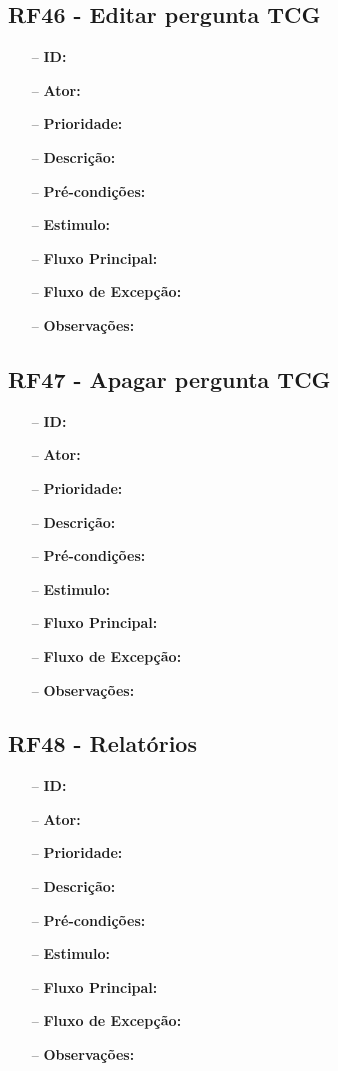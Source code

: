 \subsection{RF46 - Editar pergunta TCG}
\begin{itemize}
	\item[--] \textbf{ID:} 
	\item[--]  \textbf{Ator:} 
	\item[--]  \textbf{Prioridade:} 
	\item[--]  \textbf{Descrição:} 
	\item[--]  \textbf{Pré-condições:} 
	\item[--]  \textbf{Estimulo:}
	\item[--]  \textbf{Fluxo Principal:} 
	\subitem
	\subitem
	\subitem
	\subitem
	\item[--]  \textbf{Fluxo de Excepção:} 
	\subitem
	\subitem
	\subitem
	\subitem
	\item[--]  \textbf{Observações:} 
\end{itemize}
\newpage

\subsection{RF47 - Apagar pergunta TCG}
\begin{itemize}
	\item[--] \textbf{ID:} 
	\item[--]  \textbf{Ator:} 
	\item[--]  \textbf{Prioridade:} 
	\item[--]  \textbf{Descrição:} 
	\item[--]  \textbf{Pré-condições:} 
	\item[--]  \textbf{Estimulo:}
	\item[--]  \textbf{Fluxo Principal:} 
	\subitem
	\subitem
	\subitem
	\subitem
	\item[--]  \textbf{Fluxo de Excepção:} 
	\subitem
	\subitem
	\subitem
	\subitem
	\item[--]  \textbf{Observações:} 
\end{itemize}
\newpage

\subsection{RF48 - Relatórios}
\begin{itemize}
	\item[--] \textbf{ID:} 
	\item[--]  \textbf{Ator:} 
	\item[--]  \textbf{Prioridade:} 
	\item[--]  \textbf{Descrição:} 
	\item[--]  \textbf{Pré-condições:} 
	\item[--]  \textbf{Estimulo:}
	\item[--]  \textbf{Fluxo Principal:} 
	\subitem
	\subitem
	\subitem
	\subitem
	\item[--]  \textbf{Fluxo de Excepção:} 
	\subitem
	\subitem
	\subitem
	\subitem
	\item[--]  \textbf{Observações:} 
\end{itemize}
\newpage

